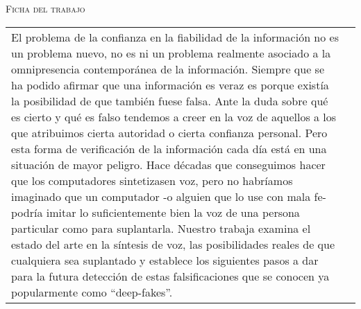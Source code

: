 {\scshape\large Ficha del trabajo \par}
\vspace{0.5cm}
\def\arraystretch{2}
\begin{center}
\begin{tabularx}{1\textwidth} { 
  | >{\raggedleft\arraybackslash}X
  | >{\raggedright\arraybackslash}X | }
\hline
\multicolumn{2}{|c|}{Resumen}\\
\hline
\multicolumn{2}{|X|}
{

El problema de la confianza en la fiabilidad de la información no es un problema nuevo, no es ni un problema realmente asociado a la omnipresencia contemporánea de la información. Siempre que se ha podido afirmar que una información es veraz es porque existía la posibilidad de que también fuese falsa. 
\newline\newline
Ante la duda sobre qué es cierto y qué es falso tendemos a creer en la voz de aquellos a los que atribuimos cierta autoridad o cierta confianza personal. Pero esta forma de verificación de la información cada día está en una situación de mayor peligro.
\newline\newline
Hace décadas que conseguimos hacer que los computadores sintetizasen voz, pero no habríamos imaginado que un computador -o alguien que lo use  con mala fe- podría imitar lo suficientemente bien la voz de una persona particular como para suplantarla.
\newline\newline
Nuestro trabaja examina el estado del arte en la síntesis de voz, las posibilidades reales de que cualquiera sea suplantado y establece los siguientes pasos a dar para la futura detección de estas falsificaciones que se conocen ya popularmente como “deep-fakes”.

} \\
\hline
\end{tabularx}
\end{center}

